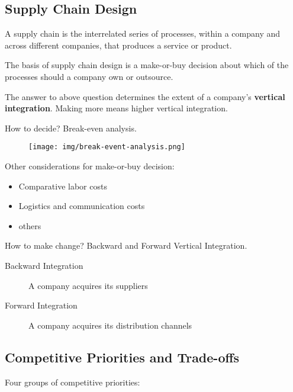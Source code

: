 \documentclass{article}
\begin{document}
\subsection{Supply Chain Design}

A supply chain is the interrelated series of processes,
within a company and across different companies, that produces a service or product.

The basis of supply chain design is a make-or-buy decision about which of the processes should a company own or outsource.

The answer to above question determines the extent of a company's \textbf{vertical integration}.
Making more means higher vertical integration.

How to decide? Break-even analysis.

\begin{figure}[H]
	\centering
	\texttt{[image: img/break-event-analysis.png]}
\end{figure}

Other considerations for make-or-buy decision:

\begin{itemize}
	\item Comparative labor costs
	\item Logistics and communication costs
	\item others
\end{itemize}

How to make change? Backward and Forward Vertical Integration.

\begin{description}
	\item[Backward Integration] A company acquires its suppliers
	\item[Forward Integration] A company acquires its distribution channels
\end{description}

\subsection{Competitive Priorities and Trade-offs}

Four groups of competitive priorities:
\end{document}
